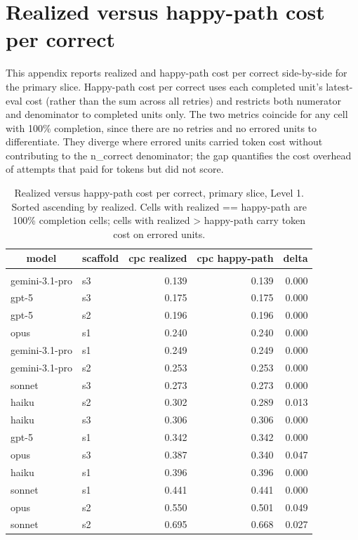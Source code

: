 \documentclass[10pt]{article} %
\begin{document}
\FloatBarrier



\section{Realized versus happy-path cost per correct}\label{app:cost_per_correct_happy_path}

    This appendix reports realized and happy-path cost per correct side-by-side for the primary slice. Happy-path cost per correct uses each completed unit's latest-eval cost (rather than the sum across all retries) and restricts both numerator and denominator to completed units only. The two metrics coincide for any cell with 100\% completion, since there are no retries and no errored units to differentiate. They diverge where errored units carried token cost without contributing to the n\_correct denominator; the gap quantifies the cost overhead of attempts that paid for tokens but did not score.

    \begin{table}[t]
        \caption{Realized versus happy-path cost per correct, primary slice, Level 1. Sorted ascending by realized. Cells with realized == happy-path are 100\% completion cells; cells with realized > happy-path carry token cost on errored units.}
    \label{tab:cpc_happy_L1}
    \begin{center}
    \small
    \begin{tabular}{llrrr}
        \multicolumn{1}{c}{\bf model} & \multicolumn{1}{c}{\bf scaffold} & \multicolumn{1}{c}{\bf cpc realized} & \multicolumn{1}{c}{\bf cpc happy-path} & \multicolumn{1}{c}{\bf delta} \\
        \hline \\
        gemini-3.1-pro & s3 & 0.139 & 0.139 & 0.000 \\
        gpt-5 & s3 & 0.175 & 0.175 & 0.000 \\
        gpt-5 & s2 & 0.196 & 0.196 & 0.000 \\
        opus & s1 & 0.240 & 0.240 & 0.000 \\
        gemini-3.1-pro & s1 & 0.249 & 0.249 & 0.000 \\
        gemini-3.1-pro & s2 & 0.253 & 0.253 & 0.000 \\
        sonnet & s3 & 0.273 & 0.273 & 0.000 \\
        haiku & s2 & 0.302 & 0.289 & 0.013 \\
        haiku & s3 & 0.306 & 0.306 & 0.000 \\
        gpt-5 & s1 & 0.342 & 0.342 & 0.000 \\
        opus & s3 & 0.387 & 0.340 & 0.047 \\
        haiku & s1 & 0.396 & 0.396 & 0.000 \\
        sonnet & s1 & 0.441 & 0.441 & 0.000 \\
        opus & s2 & 0.550 & 0.501 & 0.049 \\
        sonnet & s2 & 0.695 & 0.668 & 0.027 \\
    \end{tabular}
    \end{center}
    \end{table}
    
\end{document}
